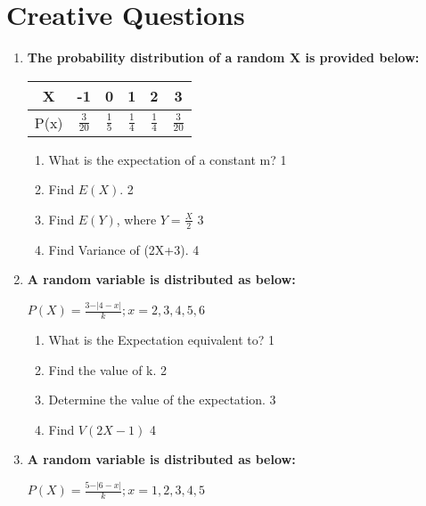 \documentclass[a4paper,oneside, margin=1.4in]{book}
\begin{document}
\section{Creative Questions}
  \begin{enumerate}
  
   \item
	  \textbf{The probability distribution of a random X is provided below:} 
	  
	  \begin{table}[h]
	  \centering
\begin{tabular}{c|ccccc}
X & -1 & 0 & 1 & 2 & 3 \\ \hline
P(x) & $\frac 3{20}$ & $\frac 15$ & $\frac 14$ & $\frac 14$ & $\frac 3{20}$
\end{tabular}
\end{table}
  
  \begin{enumerate}
    \item
	What is the expectation of a constant m? \hfill 1
    \item
	Find $E(X).$ \hfill 2
    \item  
	Find $E(Y)$, where $Y = \frac X2$  \hfill 3
    \item
	Find Variance of (2X+3). \hfill 4
  \end{enumerate}
  
        \item \textbf{A random variable is distributed as below:}
        
        \begin{center}
  \textbf{$P(X) = \frac{3-\vert 4-x\vert}{k}; x=2,3,4,5,6$}
  \end{center}

  \begin{enumerate}
    \item
	What is the Expectation equivalent to? \hfill 1
    \item
    	Find the value of k. \hfill 2
    \item
    	Determine the value of the expectation. \hfill 3
     \item
     	Find $V(2X-1)$ \hfill 4
  \end{enumerate}
  
  \item \textbf{A random variable is distributed as below:}

\begin{center}
  \textbf{$P(X) = \frac{5-\vert 6-x\vert}{k}; x=1,2,3,4,5$}
\end{center}


\end{enumerate}
\end{document}
